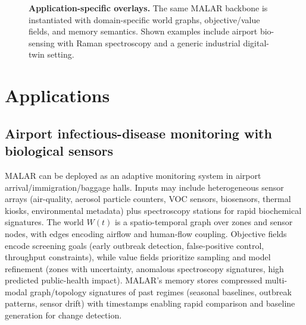 \documentclass[11pt,english]{article}
\theoremstyle{remark}
\begin{document}
\begin{figure}[t]
	\caption{
		\textbf{Application-specific overlays.}
		The same MALAR backbone is instantiated with domain-specific world graphs, objective/value fields,
		and memory semantics. Shown examples include airport bio-sensing with Raman spectroscopy and a generic industrial digital-twin setting.
	}
	\label{fig:malar-overlays}
\end{figure}


\section{Applications}
\subsection{Airport infectious-disease monitoring with biological sensors}
MALAR can be deployed as an adaptive monitoring system in airport arrival/immigration/baggage halls. Inputs may include
heterogeneous sensor arrays (air-quality, aerosol particle counters, VOC sensors, biosensors, thermal kiosks, environmental
metadata) plus spectroscopy stations for rapid biochemical signatures. The world $W(t)$ is a spatio-temporal graph over
zones and sensor nodes, with edges encoding airflow and human-flow coupling. Objective fields encode screening goals
(early outbreak detection, false-positive control, throughput constraints), while value fields prioritize sampling and
model refinement (zones with uncertainty, anomalous spectroscopy signatures, high predicted public-health impact). MALAR’s memory
stores compressed multi-modal graph/topology signatures of past regimes (seasonal baselines, outbreak patterns, sensor drift)
with timestamps enabling rapid comparison and baseline generation for change detection.
\end{document}
